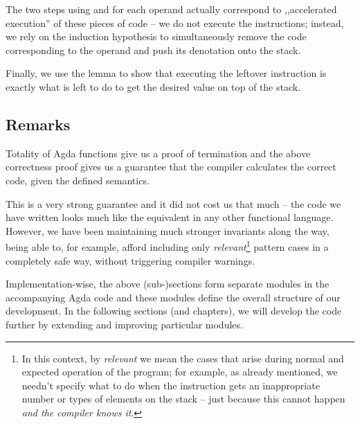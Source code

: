 The two steps using  and  for each operand
actually correspond to ,,accelerated execution'' of these pieces of code -- we
do not execute the instructions; instead, we rely on the induction hypothesis
to simultaneously remove the code corresponding to the operand and push its
denotation onto the stack.

Finally, we use the lemma  to show that executing the
leftover instruction is exactly what is left to do to get the desired value
on top of the stack.

\subsection{Remarks}

Totality of Agda functions give us a proof of termination and the above
correctness proof gives us a guarantee that the compiler calculates the correct
code, given the defined semantics.

This is a very strong guarantee and it did not cost us that much -- the code we
have written looks much like the equivalent in any other functional language.
However, we have been maintaining much stronger invariants along the way, being
able to, for example, afford including only \emph{relevant}\footnote{In this
  context, by \emph{relevant} we mean the cases that arise during normal and
  expected operation of the program; for example, as already mentioned, we
needn't specify what to do when the instruction  gets an
inappropriate number or types of elements on the stack -- just because this
cannot happen \emph{and the compiler knows it}.} pattern cases in a completely
safe way, without triggering compiler warnings.

Implementation-wise, the above (sub-)sections form separate modules in the
accompanying Agda code and these modules define the overall structure of our
development. In the following sections (and chapters), we will develop
the code further by extending and improving particular modules.

